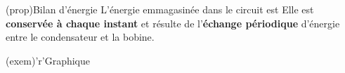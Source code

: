 \documentclass[../../main/main.tex]{subfiles}
\begin{document}
\begin{tcbraster}[raster columns=2, raster equal height=rows]
	\begin{tcb}[label=prop:lcenerg-décharge](prop){Bilan d'énergie}
		L'énergie emmagasinée dans le circuit est
		\psw{
		\[
			\boxed{\Ec = \frac{1}{2}Cu_C{}^2 + \frac{1}{2}Li^2}
		\]
		}
		Elle est \textbf{conservée à chaque instant} et résulte de l'\textbf{échange
			périodique} d'énergie entre le condensateur et la bobine.
	\end{tcb}
	\begin{tcb}[width=\linewidth](exem)'r'{Graphique}
		\begin{center}
		\end{center}
	\end{tcb}
\end{tcbraster}
\end{document}
